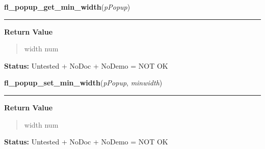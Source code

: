     \label{xformslib:flpopup:fl_popup_get_min_width}

    \vspace{0.5ex}

\hspace{.8\funcindent}\begin{boxedminipage}{\funcwidth}

    \raggedright \textbf{fl\_popup\_get\_min\_width}(\textit{pPopup})

    \vspace{-1.5ex}

    \rule{\textwidth}{0.5\fboxrule}
\setlength{\parskip}{2ex}
\setlength{\parskip}{1ex}
      \textbf{Return Value}
    \vspace{-1ex}

      \begin{quote}
      width num

      \end{quote}

\textbf{Status:} Untested + NoDoc + NoDemo = NOT OK



    \end{boxedminipage}

    \label{xformslib:flpopup:fl_popup_set_min_width}

    \vspace{0.5ex}

\hspace{.8\funcindent}\begin{boxedminipage}{\funcwidth}

    \raggedright \textbf{fl\_popup\_set\_min\_width}(\textit{pPopup}, \textit{minwidth})

    \vspace{-1.5ex}

    \rule{\textwidth}{0.5\fboxrule}
\setlength{\parskip}{2ex}
\setlength{\parskip}{1ex}
      \textbf{Return Value}
    \vspace{-1ex}

      \begin{quote}
      width num

      \end{quote}

\textbf{Status:} Untested + NoDoc + NoDemo = NOT OK



    \end{boxedminipage}


